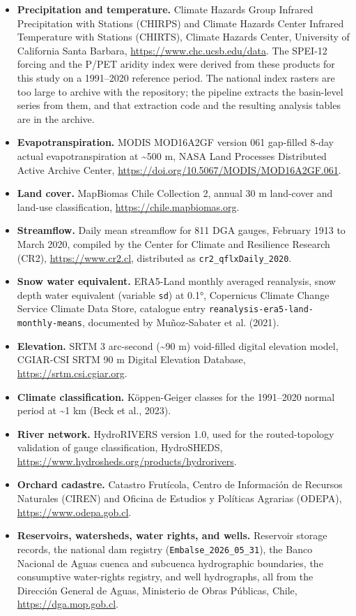 \documentclass[
]{agujournal2019}
\providecommand{\tightlist}{%
  \setlength{\itemsep}{0pt}\setlength{\parskip}{0pt}}
\begin{document}
\begin{itemize}
\tightlist
\item
  \textbf{Precipitation and temperature.} Climate Hazards Group Infrared
  Precipitation with Stations (CHIRPS) and Climate Hazards Center
  Infrared Temperature with Stations (CHIRTS), Climate Hazards Center,
  University of California Santa Barbara,
  \url{https://www.chc.ucsb.edu/data}. The SPEI-12 forcing and the P/PET
  aridity index were derived from these products for this study on a
  1991--2020 reference period. The national index rasters are too large
  to archive with the repository; the pipeline extracts the basin-level
  series from them, and that extraction code and the resulting analysis
  tables are in the archive.
\item
  \textbf{Evapotranspiration.} MODIS MOD16A2GF version 061 gap-filled
  8-day actual evapotranspiration at \textasciitilde500 m, NASA Land
  Processes Distributed Active Archive Center,
  \url{https://doi.org/10.5067/MODIS/MOD16A2GF.061}.
\item
  \textbf{Land cover.} MapBiomas Chile Collection 2, annual 30 m
  land-cover and land-use classification,
  \url{https://chile.mapbiomas.org}.
\item
  \textbf{Streamflow.} Daily mean streamflow for 811 DGA gauges,
  February 1913 to March 2020, compiled by the Center for Climate and
  Resilience Research (CR2), \url{https://www.cr2.cl}, distributed as
  \texttt{cr2\_qflxDaily\_2020}.
\item
  \textbf{Snow water equivalent.} ERA5-Land monthly averaged reanalysis,
  snow depth water equivalent (variable \texttt{sd}) at 0.1°, Copernicus
  Climate Change Service Climate Data Store, catalogue entry
  \texttt{reanalysis-era5-land-monthly-means}, documented by
  Muñoz-Sabater et al. (2021).
\item
  \textbf{Elevation.} SRTM 3 arc-second (\textasciitilde90 m)
  void-filled digital elevation model, CGIAR-CSI SRTM 90 m Digital
  Elevation Database, \url{https://srtm.csi.cgiar.org}.
\item
  \textbf{Climate classification.} Köppen-Geiger classes for the
  1991--2020 normal period at \textasciitilde1 km (Beck et al., 2023).
\item
  \textbf{River network.} HydroRIVERS version 1.0, used for the
  routed-topology validation of gauge classification, HydroSHEDS,
  \url{https://www.hydrosheds.org/products/hydrorivers}.
\item
  \textbf{Orchard cadastre.} Catastro Frutícola, Centro de Información
  de Recursos Naturales (CIREN) and Oficina de Estudios y Políticas
  Agrarias (ODEPA), \url{https://www.odepa.gob.cl}.
\item
  \textbf{Reservoirs, watersheds, water rights, and wells.} Reservoir
  storage records, the national dam registry
  (\texttt{Embalse\_2026\_05\_31}), the Banco Nacional de Aguas cuenca
  and subcuenca hydrographic boundaries, the consumptive water-rights
  registry, and well hydrographs, all from the Dirección General de
  Aguas, Ministerio de Obras Públicas, Chile,
  \url{https://dga.mop.gob.cl}.
\end{itemize}
\end{document}
